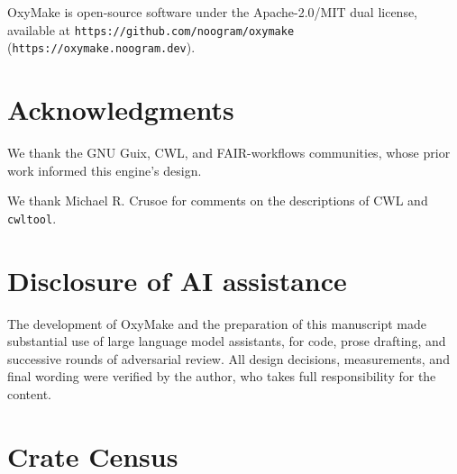 \documentclass[12pt,a4paper]{article}
\newcommand{\code}[1]{{\texttt{\small\color{inlinecode}#1}}}
\begin{document}
OxyMake is open-source software under the Apache-2.0/MIT dual license,
available at \code{https://github.com/noogram/oxymake}
(\code{https://oxymake.noogram.dev}).

\section*{Acknowledgments}

We thank the GNU Guix, CWL, and FAIR-workflows communities, whose prior
work informed this engine's design.

We thank Michael R. Crusoe for comments on the descriptions of CWL and
\code{cwltool}.

\section*{Disclosure of AI assistance}

The development of OxyMake and the preparation of this manuscript made
substantial use of large language model assistants, for code, prose
drafting, and successive rounds of adversarial review. All design
decisions, measurements, and final wording were verified by the author,
who takes full responsibility for the content.

\appendix

\section{Crate Census}
\label{app:crates}
\end{document}
